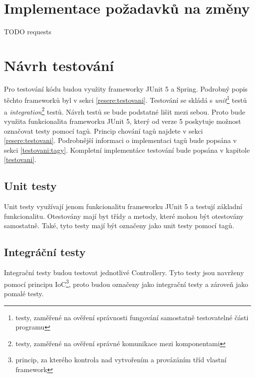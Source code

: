 \section{Implementace požadavků na změny}\label{impl:requests}
    TODO requests
    
\section{Návrh testování}\label{navrh:testovani}
    Pro testování kódu budou využity frameworky JUnit 5 a Spring. Podrobný popis těchto frameworků byl v sekci \ref{resere:testovani}. Testování se skládá s \textit{unit}\footnote{testy, zaměřené na ověření správnosti fungování samostatně testovatelné části programu} testů a \textit{integration}\footnote{testy, zaměřené na ověření správné komunikace mezi komponentami} testů. Návrh testů se bude podstatné lišit mezi sebou. Proto bude využita funkcionalita frameworku JUnit 5, který od verze 5 poskytuje možnost označovat testy pomocí tagů\cite{junit-tags}. Princip chování tagů najdete v sekci \ref{resere:testovani}. Podrobnější informaci o implementaci tagů bude popsána v sekci \ref{testovani:tagy}. 
    Kompletní implementáce testování bude popsána v kapitole \ref{testovani}.
    
    \subsection{Unit testy}
        Unit testy využívají jenom funkcionalitu frameworku JUnit 5 a testují základní funkcionalitu. Otestovány mají byt třídy a metody, které mohou být otestovány samostatně. Také, tyto testy mají být označeny jako unit testy pomocí tagů.  %
        
    \subsection{Integráční testy}
        Integrační testy budou testovat jednotlivé Controllery. Tyto testy jsou navrženy pomocí principu IoC\footnote{princip, za kterého kontrola nad vytvořením a provázáním tříd vlastní framework}, proto budou označeny jako integrační testy a zároveň jako pomalé testy.